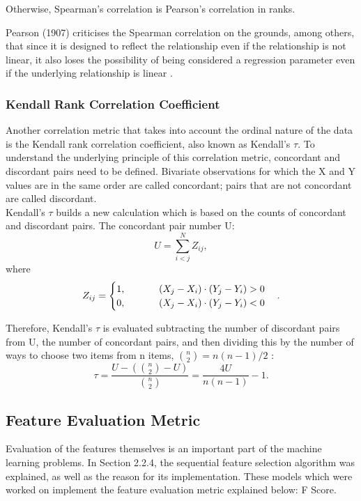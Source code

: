 Otherwise, Spearman's correlation is Pearson's correlation in ranks.

Pearson (1907) criticises the Spearman correlation on the grounds, among others, that since it is designed to reflect the relationship even if the relationship is not linear, it also loses the possibility of being considered a regression parameter even if the underlying relationship is linear \cite{Kolassa2020}.

\subsubsection{Kendall Rank Correlation Coefficient}
Another correlation metric that takes into account the ordinal nature of the data is the Kendall rank correlation coefficient, also known as Kendall's $\tau$. To understand the underlying principle of this correlation metric, concordant and discordant pairs need to be defined. Bivariate observations for which the X and Y values are in the
same order are called concordant; pairs that are not concordant are called discordant.\\

Kendall's $\tau$ builds a new calculation which is based on the 
counts of concordant and discordant pairs. The concordant pair number U:
\begin{equation}
    U=\sum_{i<j}^NZ_{ij},
\end{equation}
where\\
\begin{equation}
    Z_{ij}=
    \begin{cases}
    1,\hspace{1.2cm} (X_j-X_i)\cdot(Y_j-Y_i)>0\\ 
    0,\hspace{1.2cm} (X_j-X_i)\cdot(Y_j-Y_i)<0
    \end{cases}.
\end{equation}

Therefore, Kendall's $\tau$ is evaluated subtracting the number of discordant pairs from U, the number of concordant pairs, and then dividing this by the number of ways to choose two items from n items, ${n \choose 2}=n(n-1)/2$ :
\begin{equation}
    \tau= \frac{U-\left({n\choose2}-U\right)}{{n\choose2}}=\frac{4U}{n(n-1)}-1.
\end{equation}\hspace{15cm}\cite{Kolassa2020}
\subsection{Feature Evaluation Metric}
Evaluation of the features themselves is an important part of the machine learning problems.  
In Section 2.2.4, the sequential feature selection algorithm was explained, as well as the reason for its implementation. These models which were worked on implement the feature evaluation metric explained below: F Score.
